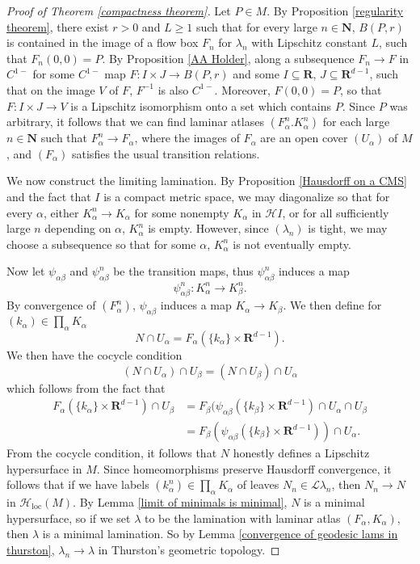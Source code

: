 \documentclass[reqno,11pt]{amsart}
\newcommand{\NN}{\mathbf{N}}
\newcommand{\RR}{\mathbf{R}}
\newcommand{\Leaves}{\mathscr L}
\newcommand{\Hypspace}{\mathscr H}
\newcommand{\loc}{\mathrm{loc}}
\theoremstyle{definition}
\numberwithin{equation}{section}
\begin{document}
\begin{proof}[Proof of Theorem \ref{compactness theorem}]
Let $P \in M$.
By Proposition \ref{regularity theorem}, there exist $r > 0$ and $L \geq 1$ such that for every large $n \in \NN$, $B(P, r)$ is contained in the image of a flow box $F_n$ for $\lambda_n$ with Lipschitz constant $L$, such that $F_n(0, 0) = P$.
By Proposition \ref{AA Holder}, along a subsequence $F_n \to F$ in $C^{1-}$ for some $C^{1-}$ map $F: I \times J \to B(P, r)$ and some $I \subseteq \RR$, $J \subseteq \RR^{d - 1}$, such that on the image $V$ of $F$, $F^{-1}$ is also $C^{1-}$.
Moreover, $F(0, 0) = P$, so that $F: I \times J \to V$ is a Lipschitz isomorphism onto a set which contains $P$.
Since $P$ was arbitrary, it follows that we can find laminar atlases $(F_\alpha^n. K_\alpha^n)$ for each large $n \in \NN$ such that $F_\alpha^n \to F_\alpha$, where the images of $F_\alpha$ are an open cover $(U_\alpha)$ of $M$, and $(F_\alpha)$ satisfies the usual transition relations.

We now construct the limiting lamination.
By Proposition \ref{Hausdorff on a CMS} and the fact that $I$ is a compact metric space, we may diagonalize so that for every $\alpha$, either $K^n_\alpha \to K_\alpha$ for some nonempty $K_\alpha$ in $\Hypspace I$, or for all sufficiently large $n$ depending on $\alpha$, $K_\alpha^n$ is empty.
However, since $(\lambda_n)$ is tight, we may choose a subsequence so that for some $\alpha$, $K_\alpha^n$ is not eventually empty.

Now let $\psi_{\alpha \beta}$ and $\psi_{\alpha \beta}^n$ be the transition maps, thus $\psi_{\alpha \beta}^n$ induces a map
$$\psi_{\alpha \beta}^n: K_\alpha^n \to K_\beta^n.$$
By convergence of $(F_\alpha^n)$, $\psi_{\alpha \beta}$ induces a map $K_\alpha \to K_\beta$.
We then define for $(k_\alpha) \in \prod_\alpha K_\alpha$
$$N \cap U_\alpha = F_\alpha(\{k_\alpha\} \times \RR^{d - 1}).$$
We then have the cocycle condition
$$(N \cap U_\alpha) \cap U_\beta = (N \cap U_\beta) \cap U_\alpha$$
which follows from the fact that
\begin{align*}
F_\alpha(\{k_\alpha\} \times \RR^{d - 1}) \cap U_\beta
&= F_\beta(\psi_{\alpha \beta}(\{k_\beta\} \times \RR^{d - 1}) \cap U_\alpha \cap U_\beta \\
&= F_\beta(\psi_{\alpha \beta}(\{k_\beta\} \times \RR^{d - 1})) \cap U_\alpha.
\end{align*}
From the cocycle condition, it follows that $N$ honestly defines a Lipschitz hypersurface in $M$.
Since homeomorphisms preserve Hausdorff convergence, it follows that if we have labels $(k_\alpha^n) \in \prod_\alpha K_\alpha$ of leaves $N_n \in \Leaves \lambda_n$, then $N_n \to N$ in $\Hypspace_\loc(M)$.
By Lemma \ref{limit of minimals is minimal}, $N$ is a minimal hypersurface, so if we set $\lambda$ to be the lamination with laminar atlas $(F_\alpha, K_\alpha)$, then $\lambda$ is a minimal lamination.
So by Lemma \ref{convergence of geodesic lams in thurston}, $\lambda_n \to \lambda$ in Thurston's geometric topology.


\end{proof}
\end{document}
